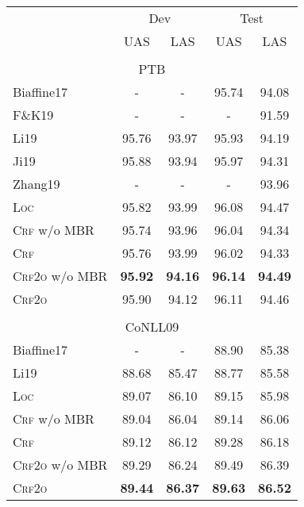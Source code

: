 \begin{table}[tb]
\setlength{\tabcolsep}{4.2pt}
\centering
\begin{tabular}{lcccc}
\toprule
& \multicolumn{2}{c}{Dev} & \multicolumn{2}{c}{Test} \\
& UAS & LAS & UAS & LAS \\[2pt]
\hline
\\[-8pt]
\multicolumn{5}{c}{PTB} \\
Biaffine17 & - & - & 95.74 & 94.08 \\
F\&K19 & - &  -  & -     & 91.59 \\
Li19 & 95.76 &  93.97 & 95.93 & 94.19 \\
Ji19 & 95.88 & 93.94 & 95.97 & 94.31 \\
Zhang19 & - & - & -  & 93.96 \\[3pt]
\textsc{Loc}             & 95.82          & 93.99          & 96.08          & 94.47 \\
\textsc{Crf} w/o MBR     & 95.74          & 93.96          & 96.04          & 94.34 \\
\textsc{Crf}             & 95.76          & 93.99          & 96.02          & 94.33 \\
\textsc{Crf2o} w/o MBR   & \textbf{95.92} & \textbf{94.16} & \textbf{96.14} & \textbf{94.49} \\
\textsc{Crf2o}           & 95.90          & 94.12          & 96.11          & 94.46 \\[2pt]
\hline
\\[-8pt]
\multicolumn{5}{c}{CoNLL09} \\
Biaffine17 & - & - & 88.90 & 85.38 \\
Li19 & 88.68 & 85.47 & 88.77 & 85.58 \\[3pt]
\textsc{Loc} & 89.07 & 86.10 & 89.15 & 85.98 \\
\textsc{Crf} w/o MBR   &         89.04  &         86.04  &         89.14                    &         86.06 \\
\textsc{Crf}           &         89.12  &         86.12  &         89.28                    &         86.18\rlap{$^\dagger$} \\
\textsc{Crf2o} w/o MBR &         89.29  &         86.24  &         89.49                    &         86.39 \\
\textsc{Crf2o}         & \textbf{89.44} & \textbf{86.37} & \textbf{89.63}\rlap{$^\ddagger$} & \textbf{86.52}\rlap{$^\ddagger$} \\[2pt]

\end{tabular}
\end{table}
